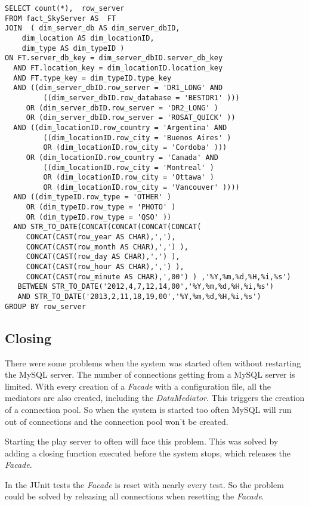 \begin{lstlisting}
SELECT count(*),  row_server 
FROM fact_SkyServer AS  FT  
JOIN  ( dim_server_db AS dim_server_dbID,  
	dim_location AS dim_locationID,  
	dim_type AS dim_typeID )
ON FT.server_db_key = dim_server_dbID.server_db_key
  AND FT.location_key = dim_locationID.location_key
  AND FT.type_key = dim_typeID.type_key
  AND ((dim_server_dbID.row_server = 'DR1_LONG' AND
         ((dim_server_dbID.row_database = 'BESTDR1' ))) 
     OR (dim_server_dbID.row_server = 'DR2_LONG' )
     OR (dim_server_dbID.row_server = 'ROSAT_QUICK' ))
  AND ((dim_locationID.row_country = 'Argentina' AND
         ((dim_locationID.row_city = 'Buenos Aires' )
         OR (dim_locationID.row_city = 'Cordoba' )))   
     OR (dim_locationID.row_country = 'Canada' AND
         ((dim_locationID.row_city = 'Montreal' )
         OR (dim_locationID.row_city = 'Ottawa' )
         OR (dim_locationID.row_city = 'Vancouver' ))))  
  AND ((dim_typeID.row_type = 'OTHER' )  
     OR (dim_typeID.row_type = 'PHOTO' )  
     OR (dim_typeID.row_type = 'QSO' ))  
  AND STR_TO_DATE(CONCAT(CONCAT(CONCAT(CONCAT(
     CONCAT(CAST(row_year AS CHAR),','),
     CONCAT(CAST(row_month AS CHAR),',') ),
     CONCAT(CAST(row_day AS CHAR),',') ),
     CONCAT(CAST(row_hour AS CHAR),',') ),
     CONCAT(CAST(row_minute AS CHAR),',00') ) ,'%Y,%m,%d,%H,%i,%s')  
   BETWEEN STR_TO_DATE('2012,4,7,12,14,00','%Y,%m,%d,%H,%i,%s')  
   AND STR_TO_DATE('2013,2,11,18,19,00','%Y,%m,%d,%H,%i,%s')
GROUP BY row_server
\end{lstlisting}


\subsection{Closing}
There were some problems when the system was started often without restarting the MySQL server.
The number of connections getting from a MySQL server is limited. With every creation of a \textit{Facade}
with a configuration file, all the mediators are also created, including the \textit{DataMediator}.
This triggers the creation of a connection pool. So when the system is started too often
MySQL will run out of connections and the connection pool won't be created.

Starting the play server to often will face this problem. This was solved by adding a closing function
executed before the system stops, which releases the \textit{Facade}.

In the JUnit tests the \textit{Facade} is reset with nearly every test. So the problem could be
solved by releasing all connections when resetting the \textit{Facade}. 

